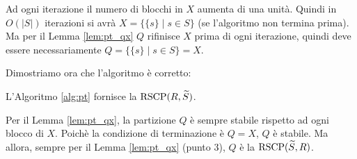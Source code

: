 \begin{proof2}
    Ad ogni iterazione il numero di blocchi in $X$ aumenta di una unità. Quindi in $O(|S|)$ iterazioni si avrà $X = \{\{s\} \mid s \in S\}$ (se l'algoritmo non termina prima). Ma per il Lemma \ref{lem:pt_qx} $Q$ rifinisce $X$ prima di ogni iterazione, quindi deve essere necessariamente $Q = \{\{s\} \mid s \in S\} = X$.
\end{proof2}
Dimostriamo ora che l'algoritmo è corretto:
\begin{proposition}
    L'Algoritmo \ref{alg:pt} fornisce la $\textup{RSCP}(R,\widetilde{S})$.
\end{proposition}
\begin{proof2}
    Per il Lemma \ref{lem:pt_qx}, la partizione $Q$ è sempre stabile rispetto ad ogni blocco di $X$. Poichè la condizione di terminazione è $Q=X$, $Q$ è stabile. Ma allora, sempre per il Lemma \ref{lem:pt_qx} (punto 3), $Q$ è la $\textup{RSCP}(\widetilde{S},R)$.
\end{proof2}

